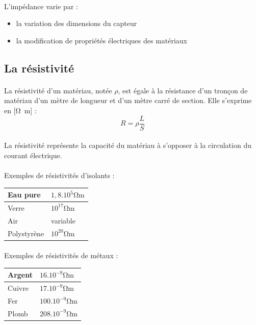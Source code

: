 \documentclass{article}
\begin{document}
\paragraph{}
L'impédance varie par :
\begin{itemize}
    \item la variation des dimensions du capteur
    \item la modification de propriétés électriques des matériaux
\end{itemize}

\subsection{La résistivité}
\paragraph{}
La résistivité d'un matériau, notée $\rho$, est égale à la résistance d'un tronçon de matériau d'un mètre de longueur et d'un mètre carré de section. Elle s'exprime en [\si{\ohm\meter}] :
$$R = \rho\frac{L}{S}$$

\paragraph{}
La résistivité représente la capacité du matériau à s'opposer à la circulation du courant électrique.

\paragraph{}
Exemples de résistivités d'isolants :
\begin{table}[H]
    \centering
    \begin{tabular}{l l}
        Eau pure & $1,8.10^5 \si{\ohm\meter}$\\
        \hline
        Verre & $10^{17} \si{\ohm\meter}$\\
        \hline
        Air & variable\\
        \hline
        Polystyrène & $10^{20} \si{\ohm\meter}$\\
    \end{tabular}
\end{table}

\paragraph{}
Exemples de résistivités de métaux :
\begin{table}[H]
    \centering
    \begin{tabular}{l l}
        Argent & $16.10^{-9} \si{\ohm\meter}$\\
        \hline
        Cuivre & $17.10^{-9} \si{\ohm\meter}$\\
        \hline
        Fer & $100.10^{-9} \si{\ohm\meter}$\\
        \hline
        Plomb & $208.10^{-9} \si{\ohm\meter}$\\
    \end{tabular}
\end{table}
\end{document}
